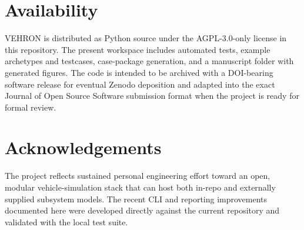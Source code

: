 \documentclass[11pt,a4paper]{article}
\begin{document}
\section{Availability}
VEHRON is distributed as Python source under the AGPL-3.0-only license in this repository. The present workspace includes automated tests, example archetypes and testcases, case-package generation, and a manuscript folder with generated figures. The code is intended to be archived with a DOI-bearing software release for eventual Zenodo deposition and adapted into the exact Journal of Open Source Software submission format when the project is ready for formal review.

\section{Acknowledgements}
The project reflects sustained personal engineering effort toward an open, modular vehicle-simulation stack that can host both in-repo and externally supplied subsystem models. The recent CLI and reporting improvements documented here were developed directly against the current repository and validated with the local test suite.



\end{document}
